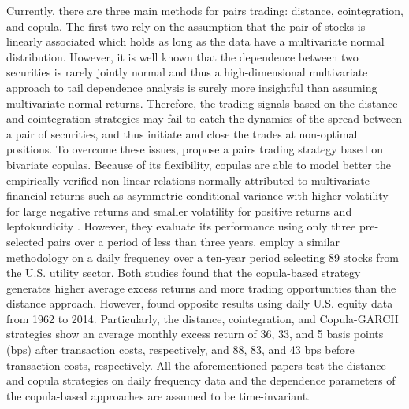 \documentclass[a4paper,12pt]{report}
\begin{document}
\begin{refsection}
Currently, there are three main methods for pairs trading: distance, cointegration, and copula. The first two rely on the assumption that the pair of stocks is linearly associated which holds as long as the data have a multivariate normal distribution. However, it is well known that the dependence between two securities is rarely jointly normal \citep{campbell97,cont01,ane03,mcneil15} and thus a high-dimensional multivariate approach to tail dependence analysis is surely more insightful than assuming multivariate normal returns. Therefore, the trading signals based on the distance and cointegration strategies may fail to catch the dynamics of the spread between a pair of securities, and thus initiate and close the trades at non-optimal positions. To overcome these issues, \citet*{lw2013} propose a pairs trading strategy based on bivariate copulas. Because of its flexibility, copulas are able to model better the empirically verified non-linear relations normally attributed to multivariate financial returns such as asymmetric conditional variance with higher volatility for large negative returns and smaller volatility for positive returns \citep{h98} and leptokurdicity \citep{t01,andreou01}. However, they evaluate its performance using only three pre-selected pairs over a period of less than three years. \citet*{xie14} employ a similar methodology on a daily frequency over a ten-year period selecting 89 stocks from the U.S. utility sector. Both studies found that the copula-based strategy generates higher average excess returns and more trading opportunities than the distance approach. However, \citet*{rf15} found opposite results using daily U.S. equity data from 1962 to 2014. Particularly, the distance, cointegration, and Copula-GARCH strategies show an average monthly excess return of 36, 33, and 5 basis points (bps) after transaction costs, respectively, and 88, 83, and 43 bps before transaction costs, respectively.  All the aforementioned papers test the distance and copula strategies on daily frequency data and the dependence parameters of the copula-based approaches are assumed to be time-invariant.


\end{refsection}
\end{document}
